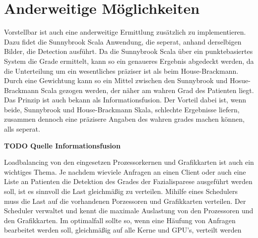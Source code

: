 \section{Anderweitige Möglichkeiten}\label{other}
Vorstellbar ist auch eine anderweitige Ermittlung zusätzlich zu implementieren. Dazu fidet die Sunnybrook Scala Anwendung, die seperat, anhand derselbigen Bilder, die Detection ausführt. Da die Sunnybrook Scala über ein punktebasiertes System die Grade ermittelt, kann so ein genaueres Ergebnis abgedeckt werden, da die Unterteilung um ein wesentliches präziser ist als beim House-Brackmann. Durch eine Gewichtung kann so ein Mittel zwischen den Sunnybrook und Hosue-Brackmann Scala gezogen werden, der näher am wahren Grad des Patienten liegt. Das Prinzip ist auch bekann als Informationsfusion. Der Vorteil dabei ist, wenn beide, Sunnybrook und House-Brackmann Skala, schlechte Ergebnisse liefern, zusammen dennoch eine präzisere Angaben des wahren grades machen können, alls seperat.

\textbf{TODO Quelle Informationsfusion}

\vspace{0.5cm}

Loadbalancing von den eingesetzen Prozessorkernen und Grafikkarten ist auch ein wichtiges Thema. Je nachdem wieviele Anfragen an einen Client oder auch eine Liste an Patienten die Detektion des Grades der Fazialisparese ausgeführt werden soll, ist es sinnvoll die Last gleichmäßig zu verteilen. Mihilfe eines Schedulers muss die Last auf die vorhandenen Porzessoren und Grafikkarten verteilen. Der Scheduler verwaltet und kennt die maximale Auslastung von den Prozessoren und den Grafikkarten. Im optimalfall sollte so, wenn eine Häufung von Anfragen bearbeitet werden soll, gleichmäßig auf alle Kerne und GPU's, verteilt werden
